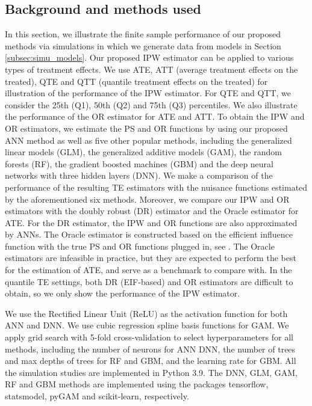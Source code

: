 \documentclass[11pt]{article}
\numberwithin{equation}{section}
\begin{document}
\subsection{Background and methods used}
In this section, we illustrate the finite sample performance of our proposed methods via simulations in which we generate data from models in Section \ref{subsec:simu_models}. Our proposed IPW estimator can be applied to various types of treatment effects. We use ATE, ATT (average treatment effects on the treated), QTE and QTT (quantile treatment effects on the treated) for illustration of the performance of the IPW estimator. For QTE and QTT, we consider the 25th (Q1), 50th (Q2) and 75th (Q3) percentiles. We also illustrate the performance of the OR estimator for ATE and ATT. To obtain the IPW and OR estimators, we estimate the PS and OR functions by using our proposed ANN method as well as five other popular methods, including the generalized linear models (GLM), the generalized additive models (GAM), the random forests (RF), the gradient boosted machines (GBM) and the deep neural networks with three hidden layers (DNN). We make a comparison of the performance of the resulting TE estimators with the nuisance functions estimated by the aforementioned six methods. Moreover, we compare our IPW and OR estimators with the doubly robust (DR) estimator \citep{farrell2018deep} and the Oracle estimator for ATE. For the DR estimator, the IPW and OR functions are also approximated by ANNs. The Oracle estimator is constructed based on the efficient influence function with the true PS and OR functions plugged in, see \cite{hahn1998role}. The Oracle estimators are infeasible in practice, but they are expected to perform the best for the estimation of ATE, and serve as a benchmark to compare with. In the quantile TE settings, both DR (EIF-based) and OR estimators are difficult to obtain, so we only show the performance of the IPW estimator.

We use the Rectified Linear Unit (ReLU) as the activation function for both ANN and DNN. We use cubic regression spline basis functions for GAM. We apply grid search with 5-fold cross-validation to select hyperparameters for all methods, including the number of neurons for ANN DNN, the number of trees and max depths of trees for RF and GBM, and the learning rate for GBM. All the simulation studies are implemented in Python 3.9. The DNN, GLM, GAM, RF and GBM methods are implemented using the packages tensorflow, statsmodel, pyGAM and scikit-learn, respectively.
\end{document}
